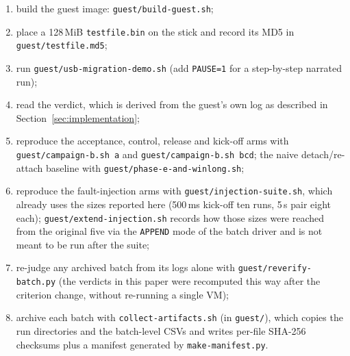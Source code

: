 \documentclass[10pt,conference]{IEEEtran}
\newcommand{\code}[1]{\texttt{#1}}
\begin{document}
\begin{enumerate}
  \item build the guest image: \code{guest/build-guest.sh};
  \item place a 128\,MiB \code{testfile.bin} on the stick and record its MD5 in
        \code{guest/testfile.md5};
  \item run \code{guest/usb-migration-demo.sh} (add \code{PAUSE=1} for a
        step-by-step narrated run);
  \item read the verdict, which is derived from the guest's own log as
        described in Section~\ref{sec:implementation};
  \item reproduce the acceptance, control, release and kick-off arms with
        \code{guest/campaign-b.sh a} and \code{guest/campaign-b.sh bcd}; the naive
        detach/re-attach baseline with \code{guest/phase-e-and-winlong.sh};
  \item reproduce the fault-injection arms with \code{guest/injection-suite.sh},
        which already uses the sizes reported here (500\,ms kick-off ten runs,
        5\,s pair eight each); \code{guest/extend-injection.sh} records how those
        sizes were reached from the original five via the \code{APPEND} mode of
        the batch driver and is not meant to be run after the suite;
  \item re-judge any archived batch from its logs alone with
        \code{guest/reverify-batch.py} (the verdicts in this paper were
        recomputed this way after the criterion change, without re-running a
        single VM);
  \item archive each batch with \code{collect-artifacts.sh} (in \code{guest/}),
        which copies the run directories and the batch-level CSVs and writes
        per-file SHA-256 checksums plus a manifest generated by
        \code{make-manifest.py}.
\end{enumerate}



\end{document}
